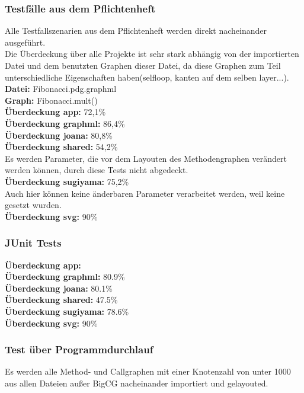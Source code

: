 \subsubsection{Testfälle aus dem Pflichtenheft}
Alle Testfallszenarien aus dem Pflichtenheft werden direkt nacheinander ausgeführt.\\
Die Überdeckung über alle Projekte ist sehr stark abhängig von der importierten Datei und dem benutzten Graphen dieser Datei, da diese Graphen zum Teil unterschiedliche Eigenschaften haben(selfloop, kanten auf dem selben layer...).\\

\textbf{Datei: }Fibonacci.pdg.graphml\\
\textbf{Graph: }Fibonacci.mult()\\
\textbf{Überdeckung app: }72,1\%\\
\textbf{Überdeckung graphml: }86,4\%\\
\textbf{Überdeckung joana: }80,8\%\\
\textbf{Überdeckung shared: }54,2\%\\
Es werden Parameter, die vor dem Layouten des Methodengraphen verändert werden können, durch diese Tests nicht abgedeckt.\\
\textbf{Überdeckung sugiyama: }75,2\%\\
Auch hier können keine änderbaren Parameter verarbeitet werden, weil keine gesetzt wurden.\\
\textbf{Überdeckung svg: }90\%\\
\subsubsection{JUnit Tests}

\textbf{Überdeckung app: }\\
\textbf{Überdeckung graphml: }80.9\%\\
\textbf{Überdeckung joana: }80.1\%\\
\textbf{Überdeckung shared: }47.5\%\\
\textbf{Überdeckung sugiyama: }78.6\%\\
\textbf{Überdeckung svg: }90\%\\

\subsubsection{Test über Programmdurchlauf}
Es werden alle Method- und Callgraphen mit einer Knotenzahl von unter 1000 aus allen Dateien außer BigCG nacheinander importiert und gelayouted.\\

